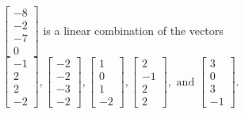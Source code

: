 \begin{exercise}
\begin{exerciseStatement}
  \end{exerciseStatement}
  \begin{exerciseAnswer}
   \(\left[\begin{array}{c}
-8 \\
-2 \\
-7 \\
0
\end{array}\right]\) 
  	 is  
	a linear combination of the vectors \(\left[\begin{array}{c}
-1 \\
2 \\
2 \\
-2
\end{array}\right] , \left[\begin{array}{c}
-2 \\
-2 \\
-3 \\
-2
\end{array}\right] , \left[\begin{array}{c}
1 \\
0 \\
1 \\
-2
\end{array}\right] , \left[\begin{array}{c}
2 \\
-1 \\
2 \\
2
\end{array}\right] , \text{ and } \left[\begin{array}{c}
3 \\
0 \\
3 \\
-1
\end{array}\right]\).

	
  


  \end{exerciseAnswer}
\end{exercise}